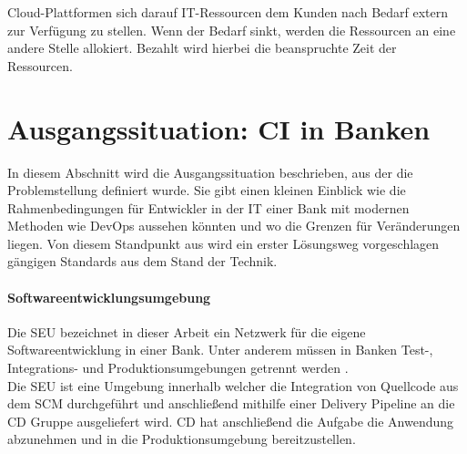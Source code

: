 Cloud-Plattformen sich darauf IT-Ressourcen dem Kunden nach Bedarf extern zur Verfügung zu stellen. Wenn der Bedarf sinkt, werden die Ressourcen an eine andere Stelle allokiert. Bezahlt wird hierbei die beanspruchte Zeit der Ressourcen. 

\section{Ausgangssituation: CI in Banken}
\label{grundlagen:ci-in-banken}
In diesem Abschnitt wird die Ausgangssituation beschrieben, aus der die Problemstellung definiert wurde. Sie gibt einen kleinen Einblick wie die Rahmenbedingungen für Entwickler in der IT einer Bank mit modernen Methoden wie DevOps aussehen könnten und wo die Grenzen für Veränderungen liegen. Von diesem Standpunkt aus wird ein erster Lösungsweg vorgeschlagen gängigen Standards aus dem Stand der Technik. 
%
\paragraph{Softwareentwicklungsumgebung}
Die \ac{SEU} bezeichnet in dieser Arbeit ein Netzwerk für die eigene Softwareentwicklung in einer Bank. Unter anderem müssen in Banken Test-, Integrations- und Produktionsumgebungen getrennt werden \cite{MaRisk:2017}. 
\medskip
\\
Die \ac{SEU} ist eine Umgebung innerhalb welcher die Integration von Quellcode aus dem \ac{SCM} durchgeführt und anschließend mithilfe einer Delivery Pipeline an die \ac{CD} Gruppe ausgeliefert wird. \ac{CD} hat anschließend die Aufgabe die Anwendung abzunehmen und in die Produktionsumgebung bereitzustellen.

